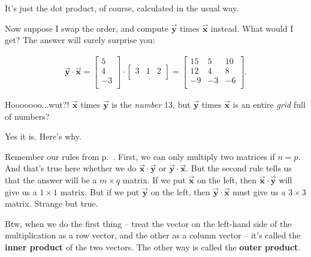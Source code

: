 It's just the dot product, of course, calculated in the usual way.

Now suppose I swap the order, and compute $\overrightarrow{\textbf{y}}$ times
$\overrightarrow{\textbf{x}}$ instead. What would I get? The answer will surely
surprise you:

\vspace{-.15in}
\begin{align*}
\overrightarrow{\textbf{y}} \cdot \overrightarrow{\textbf{x}} =
\begin{bmatrix}
5 \\ 4 \\ -3 \\
\end{bmatrix} \cdot
\begin{bmatrix}
3 & 1 & 2 \\
\end{bmatrix} =
\begin{bmatrix}
15 & 5 & 10 \\
12 & 4 & 8 \\
-9 & -3 & -6 \\
\end{bmatrix}.
\end{align*}
\vspace{-.15in}

Hooooooo...wut?! $\overrightarrow{\textbf{x}}$ times
$\overrightarrow{\textbf{y}}$ is the \textit{number} 13, but
$\overrightarrow{\textbf{y}}$ times $\overrightarrow{\textbf{x}}$ is an entire
\textit{grid} full of numbers?

Yes it is. Here's why. 

Remember our rules from p.~\pageref{matMultRules}. First, we can only multiply
two matrices if $n=p$. And that's true here whether we do
$\overrightarrow{\textbf{x}} \cdot \overrightarrow{\textbf{y}}$ or
$\overrightarrow{\textbf{y}} \cdot \overrightarrow{\textbf{x}}$. But the second
rule tells us that the answer will be a $m\times q$ matrix. If we put
$\overrightarrow{\textbf{x}}$ on the left, then $\overrightarrow{\textbf{x}}
\cdot \overrightarrow{\textbf{y}}$ will give us a $1\times 1$ matrix. But if we
put $\overrightarrow{\textbf{y}}$ on the left, then
$\overrightarrow{\textbf{y}} \cdot \overrightarrow{\textbf{x}}$ must give us a
$3\times 3$ matrix. Strange but true.

\label{outerProduct}

Btw, when we do the first thing -- treat the vector on the left-hand side of
the multiplication as a row vector, and the other as a column vector -- it's
called the \textbf{inner product} of the two vectors. The other way is called
the \textbf{outer product}.

